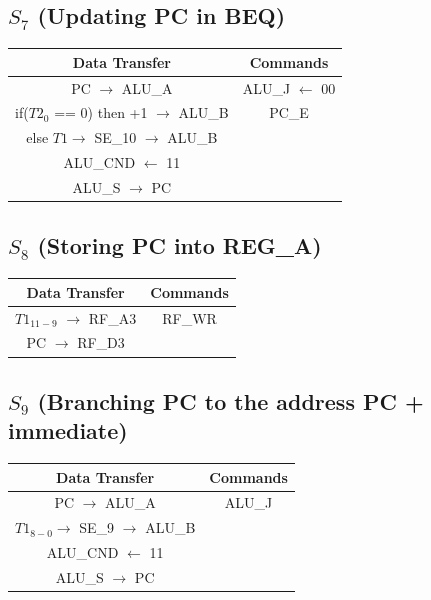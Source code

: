 \documentclass[]{report}
\begin{document}
        \subsection*{$S_7$ (Updating PC in BEQ)} %
        \begin{center}
            \begin{tabular}{|c|c|}
                \hline
                Data Transfer & Commands \\
                \hline
                PC $\to$ ALU\_A & ALU\_J $\leftarrow$ 00\\
                if($T2_0$ == 0) then +1 $\to$ ALU\_B & PC\_E\\
                else $T1 \to$ SE\_10 $\to$ ALU\_B & \\
                ALU\_CND $\leftarrow$ 11 & \\
                ALU\_S $\to$ PC & \\
                \hline
            \end{tabular}
        \end{center}
        \subsection*{$S_8$ (Storing PC into REG\_A)} %
        \begin{center}
            \begin{tabular}{|c|c|}
                \hline
                Data Transfer & Commands \\
                \hline
                $T1_{11-9}$ $\to$ RF\_A3 & RF\_WR\\
                PC $\to$ RF\_D3 & \\
                \hline
            \end{tabular}
        \end{center}
        \subsection*{$S_9$ (Branching PC to the address PC + immediate)} %
        \begin{center}
            \begin{tabular}{|c|c|}
                \hline
                Data Transfer & Commands \\
                \hline
                PC $\to$ ALU\_A & ALU\_J\\
                $T1_{8-0} \to$ SE\_9 $\to$ ALU\_B & \\
                ALU\_CND $\leftarrow$ 11 & \\
                ALU\_S $\to$ PC & \\
                \hline
            \end{tabular}
        \end{center}
\end{document}
